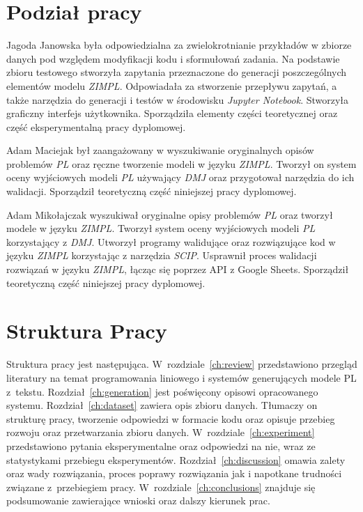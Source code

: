 \section{Podział pracy}

Jagoda Janowska była odpowiedzialna za zwielokrotnianie przykładów w zbiorze danych pod względem modyfikacji kodu i sformułowań zadania. Na podstawie zbioru testowego stworzyła zapytania przeznaczone do generacji poszczególnych elementów modelu \textit{ZIMPL}. Odpowiadała za stworzenie przepływu zapytań, a także narzędzia do generacji i testów w środowisku \textit{Jupyter Notebook}. Stworzyła graficzny interfejs użytkownika. Sporządziła elementy części teoretycznej oraz część eksperymentalną pracy dyplomowej.

Adam Maciejak był zaangażowany w wyszukiwanie oryginalnych opisów problemów \textit{PL} oraz ręczne tworzenie modeli w języku \textit{ZIMPL}. Tworzył on system oceny wyjściowych modeli \textit{PL} używający \textit{DMJ} oraz przygotował narzędzia do ich walidacji. Sporządził teoretyczną część niniejszej pracy dyplomowej.

Adam Mikołajczak wyszukiwał oryginalne opisy problemów \textit{PL} oraz tworzył modele w języku \textit{ZIMPL}. Tworzył system oceny wyjściowych modeli \textit{PL} korzystający z \textit{DMJ}. Utworzył programy walidujące oraz rozwiązujące kod w języku \textit{ZIMPL} korzystając z narzędzia \textit{SCIP}. Usprawnił proces walidacji rozwiązań w języku \textit{ZIMPL}, łącząc się poprzez API z Google Sheets. Sporządził teoretyczną część niniejszej pracy dyplomowej. 

\section{Struktura Pracy}

Struktura pracy jest następująca. W~rozdziale~\ref{ch:review} przedstawiono przegląd literatury na temat programowania liniowego i systemów generujących modele PL z~tekstu. Rozdział~\ref{ch:generation} jest poświęcony opisowi opracowanego systemu. Rozdział~\ref{ch:dataset} zawiera opis zbioru danych. Tłumaczy on strukturę pracy, tworzenie odpowiedzi w formacie kodu  oraz opisuje przebieg rozwoju oraz przetwarzania zbioru danych. W~rozdziale~\ref{ch:experiment} przedstawiono pytania eksperymentalne oraz odpowiedzi na nie, wraz ze statystykami przebiegu eksperymentów. Rozdział~\ref{ch:discussion} omawia zalety oraz wady rozwiązania, proces poprawy rozwiązania jak i napotkane trudności związane z~przebiegiem pracy. W~rozdziale~\ref{ch:conclusions} znajduje się podsumowanie zawierające wnioski oraz dalszy kierunek prac.
